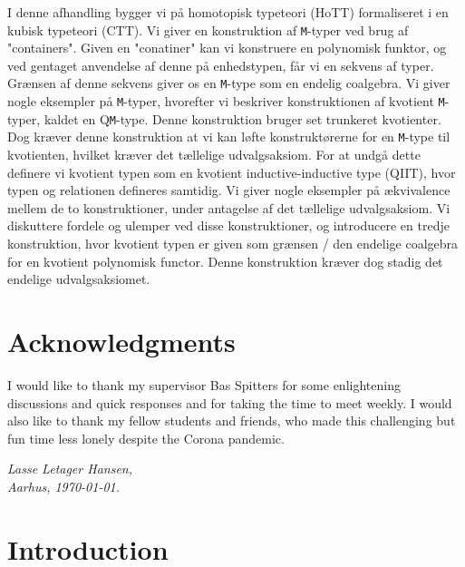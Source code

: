 \documentclass[twoside,11pt,openright]{report}
\theoremstyle{plain} %
\theoremstyle{definition}
\theoremstyle{remark}
\begin{document}
I denne afhandling bygger vi på homotopisk typeteori (HoTT) formaliseret i en kubisk typeteori (CTT). Vi giver en konstruktion af \texttt{M}-typer ved brug af "containers". Given en "conatiner" kan vi konstruere en polynomisk funktor, og ved gentaget anvendelse af denne på enhedstypen, får vi en sekvens af typer. Grænsen af denne sekvens giver os en \texttt{M}-type som en endelig coalgebra. Vi giver nogle eksempler på \texttt{M}-typer, hvorefter vi beskriver konstruktionen af kvotient \texttt{M}-typer, kaldet en Q\texttt{M}-type. Denne konstruktion bruger set trunkeret kvotienter. Dog kræver denne konstruktion at vi kan løfte konstruktørerne for en \texttt{M}-type til kvotienten, hvilket kræver det tællelige udvalgsaksiom. For at undgå dette definere vi kvotient typen som en kvotient inductive-inductive type (QIIT), hvor typen og relationen defineres samtidig. Vi giver nogle eksempler på ækvivalence mellem de to konstruktioner, under antagelse af det tællelige udvalgsaksiom. Vi diskuttere fordele og ulemper ved disse konstruktioner, og introducere en tredje konstruktion, hvor kvotient typen er given som grænsen / den endelige coalgebra for en kvotient polynomisk functor. Denne konstruktion kræver dog stadig det endelige udvalgsaksiomet.

\chapter*{Acknowledgments}
I would like to thank my supervisor Bas Spitters for some enlightening discussions and quick responses and for taking the time to meet weekly. I would also like to thank my fellow students and friends, who made this challenging but fun time less lonely despite the Corona pandemic.
\vspace{2ex}
\begin{flushright}
  \emph{Lasse Letager Hansen,}\\
  \emph{Aarhus, \today.}
\end{flushright}

\tableofcontents
\cleardoublepage
{}
\setcounter{secnumdepth}{3} %


\chapter{Introduction} %
\label{ch:intro}
\end{document}
